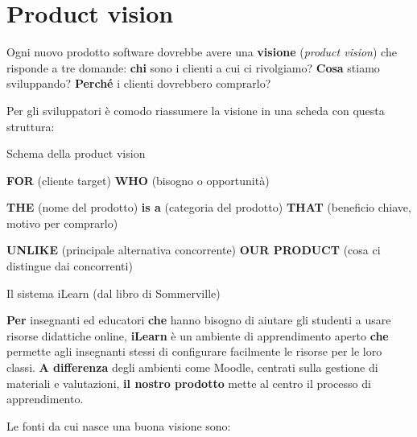 \section{Product vision}\label{product-vision}

Ogni nuovo prodotto software dovrebbe avere una \textbf{visione}
(\emph{product vision}) che risponde a tre domande: \textbf{chi} sono i
clienti a cui ci rivolgiamo? \textbf{Cosa} stiamo sviluppando?
\textbf{Perché} i clienti dovrebbero comprarlo?

Per gli sviluppatori è comodo riassumere la visione in una scheda con
questa struttura:

\begin{boxdefinition}{Schema della product vision}

\textbf{FOR} (cliente target) \textbf{WHO} (bisogno o opportunità)

\textbf{THE} (nome del prodotto) \textbf{is a} (categoria del prodotto)
\textbf{THAT} (beneficio chiave, motivo per comprarlo)

\textbf{UNLIKE} (principale alternativa concorrente) \textbf{OUR
PRODUCT} (cosa ci distingue dai concorrenti)

\end{boxdefinition}

\begin{boxexample}{Il sistema iLearn (dal libro di Sommerville)}

\textbf{Per} insegnanti ed educatori \textbf{che} hanno bisogno di
aiutare gli studenti a usare risorse didattiche online, \textbf{iLearn}
è un ambiente di apprendimento aperto \textbf{che} permette agli
insegnanti stessi di configurare facilmente le risorse per le loro
classi. \textbf{A differenza} degli ambienti come Moodle, centrati sulla
gestione di materiali e valutazioni, \textbf{il nostro prodotto} mette
al centro il processo di apprendimento.

\end{boxexample}

Le fonti da cui nasce una buona visione sono:

